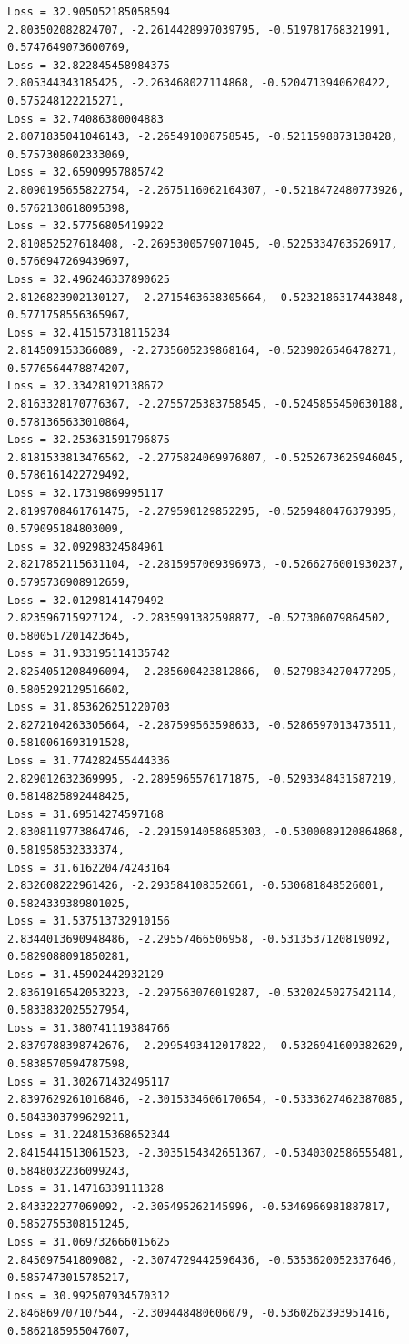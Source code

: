 \documentclass[11pt]{article}
\begin{document}
\begin{Verbatim}[commandchars=\\\{\}]
Loss = 32.905052185058594
2.803502082824707, -2.2614428997039795, -0.519781768321991, 0.5747649073600769,
Loss = 32.822845458984375
2.805344343185425, -2.263468027114868, -0.5204713940620422, 0.575248122215271,
Loss = 32.74086380004883
2.8071835041046143, -2.265491008758545, -0.5211598873138428, 0.5757308602333069,
Loss = 32.65909957885742
2.8090195655822754, -2.2675116062164307, -0.5218472480773926,
0.5762130618095398,
Loss = 32.57756805419922
2.810852527618408, -2.2695300579071045, -0.5225334763526917, 0.5766947269439697,
Loss = 32.496246337890625
2.8126823902130127, -2.2715463638305664, -0.5232186317443848,
0.5771758556365967,
Loss = 32.415157318115234
2.814509153366089, -2.2735605239868164, -0.5239026546478271, 0.5776564478874207,
Loss = 32.33428192138672
2.8163328170776367, -2.2755725383758545, -0.5245855450630188,
0.5781365633010864,
Loss = 32.253631591796875
2.8181533813476562, -2.2775824069976807, -0.5252673625946045,
0.5786161422729492,
Loss = 32.17319869995117
2.8199708461761475, -2.279590129852295, -0.5259480476379395, 0.579095184803009,
Loss = 32.09298324584961
2.8217852115631104, -2.2815957069396973, -0.5266276001930237,
0.5795736908912659,
Loss = 32.01298141479492
2.823596715927124, -2.2835991382598877, -0.527306079864502, 0.5800517201423645,
Loss = 31.933195114135742
2.8254051208496094, -2.285600423812866, -0.5279834270477295, 0.5805292129516602,
Loss = 31.853626251220703
2.8272104263305664, -2.287599563598633, -0.5286597013473511, 0.5810061693191528,
Loss = 31.774282455444336
2.829012632369995, -2.2895965576171875, -0.5293348431587219, 0.5814825892448425,
Loss = 31.69514274597168
2.8308119773864746, -2.2915914058685303, -0.5300089120864868, 0.581958532333374,
Loss = 31.616220474243164
2.832608222961426, -2.293584108352661, -0.530681848526001, 0.5824339389801025,
Loss = 31.537513732910156
2.8344013690948486, -2.29557466506958, -0.5313537120819092, 0.5829088091850281,
Loss = 31.45902442932129
2.8361916542053223, -2.297563076019287, -0.5320245027542114, 0.5833832025527954,
Loss = 31.380741119384766
2.8379788398742676, -2.2995493412017822, -0.5326941609382629,
0.5838570594787598,
Loss = 31.302671432495117
2.8397629261016846, -2.3015334606170654, -0.5333627462387085,
0.5843303799629211,
Loss = 31.224815368652344
2.8415441513061523, -2.3035154342651367, -0.5340302586555481,
0.5848032236099243,
Loss = 31.14716339111328
2.843322277069092, -2.305495262145996, -0.5346966981887817, 0.5852755308151245,
Loss = 31.069732666015625
2.845097541809082, -2.3074729442596436, -0.5353620052337646, 0.5857473015785217,
Loss = 30.992507934570312
2.846869707107544, -2.309448480606079, -0.5360262393951416, 0.5862185955047607,

\end{Verbatim}
\end{document}
